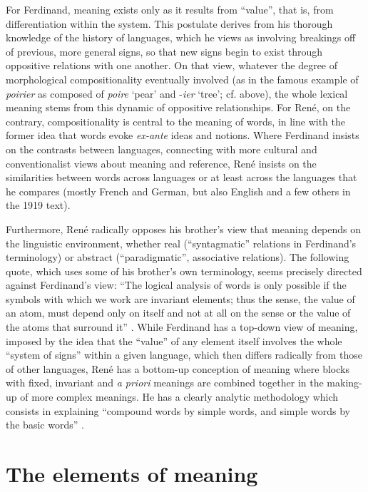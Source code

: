 \documentclass[output=paper]{langsci/langscibook}
\begin{document}
For Ferdinand, meaning exists only as it results from ``value'', that
is, from differentiation within the system. This postulate derives
from his thorough knowledge of the history of languages, which he
views as involving breakings off of previous, more general signs, so
that new signs begin to exist through oppositive relations with one
another. On that view, whatever the degree of morphological
compositionality eventually involved (as in the famous example of
\emph{poirier} as composed of \emph{poire} `pear' and -\emph{ier}
`tree'; cf.  above), the whole
lexical meaning stems from this dynamic of oppositive
relationships. For René, on the contrary, compositionality is central
to the meaning of words, in line with the former idea that words evoke
\emph{ex-ante} ideas and notions. Where Ferdinand insists on the
contrasts between languages, connecting with more cultural and
conventionalist views about meaning and reference, René insists on the
similarities between words across languages or at least across the
languages that he compares (mostly French and German, but also English
and a few others in the 1919 text).

Furthermore, René radically opposes his brother’s view that meaning
depends on the linguistic environment, whether real (``syntagmatic''
relations in Ferdinand’s terminology) or abstract (``paradigmatic'',
associative relations). The following quote, which uses some of his
brother’s own terminology, seems precisely directed against
Ferdinand’s view: “The logical analysis of words is only possible if
the symbols with which we work are invariant elements; thus the sense,
the value of an atom, must depend only on itself and not at all on the
sense or the value of the atoms that surround it”
\citep[8]{r.desaussure11:formation}. While Ferdinand has a top-down
view of meaning, imposed by the idea that the ``value'' of any element
itself involves the whole ``system of signs'' within a given language,
which then differs radically from those of other languages, René has a
bottom-up conception of meaning where blocks with fixed, invariant and
\emph{a priori} meanings are combined together in the making-up of
more complex meanings. He has a clearly analytic methodology which
consists in explaining “compound words by simple words, and simple
words by the basic words”
\citep[21]{r.desaussure19:structure.logique}.

\section{The elements of meaning}
\label{sec:elements-meaning}
\end{document}

